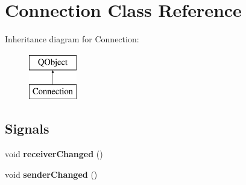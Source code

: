 \hypertarget{classConnection}{}\section{Connection Class Reference}
\label{classConnection}
Inheritance diagram for Connection\+:\begin{figure}[H]
\begin{center}
\leavevmode
\includegraphics[height=2.000000cm]{classConnection}
\end{center}
\end{figure}
\subsection*{Signals}
\begin{DoxyCompactItemize}
\item 
\mbox{\label{classConnection_a33165f69da60f638d3d8412e3ccc4312}} 
void {\bfseries receiver\+Changed} ()
\item 
\mbox{\label{classConnection_acd694eeb6ad7e287aacd356b95fe6dd9}} 
void {\bfseries sender\+Changed} ()
\end{DoxyCompactItemize}
